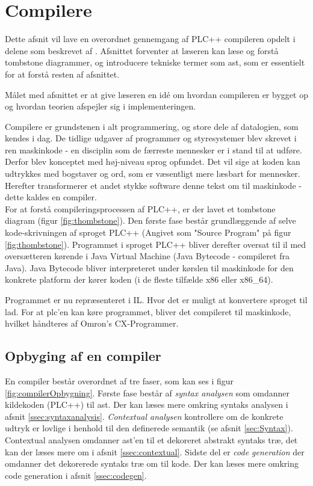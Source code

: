 \section{Compilere}
\noindent Dette afsnit vil lave en overordnet gennemgang af PLC++ compileren opdelt i delene som beskrevet af \textcite{CraftingCompiler_2009}. Afsnittet forventer at læseren kan læse og forstå tombstone diagrammer, og introducere tekniske termer som \acrlong{ast}, som er essentielt for at forstå resten af afsnittet. 

Målet med afsnittet er at give læseren en idé om hvordan compileren er bygget op og hvordan teorien afspejler sig i implementeringen.

\bigskip

\noindent Compilere er grundstenen i alt programmering, og store dele af datalogien, som kendes i dag. De tidlige udgaver af programmer og styresystemer blev skrevet i ren maskinkode - en disciplin som de færreste mennesker er i stand til at udføre. Derfor blev konceptet med høj-niveau sprog opfundet. Det vil sige at koden kan udtrykkes med bogstaver og ord, som er væsentligt mere læsbart for mennesker. Herefter transformerer et andet stykke software denne tekst om til maskinkode - dette kaldes en compiler. \\

\noindent For at forstå compileringsprocessen af PLC++, er der lavet et tombstone diagram (figur \ref{fig:thombstone}). Den første fase består grundlæggende af selve kode-skrivningen af sproget PLC++ (Angivet som "Source Program" på figur \ref{fig:thombstone}). Programmet i sproget PLC++ bliver derefter oversat til \gls{il} med oversætteren kørende i Java Virtual Machine (Java Bytecode - compileret fra Java). Java Bytecode bliver interpreteret under kørslen til maskinkode for den konkrete platform der kører koden (i de fleste tilfælde x86 eller x86\_64).

\noindent Programmet er nu repræsenteret i IL. Hvor det er muligt at konvertere sproget til \gls{lad}. For at \gls{plc}’en kan køre programmet, bliver det compileret til maskinkode, hvilket håndteres af Omron’s CX-Programmer.


\subsection{Opbyging af en compiler}
En compiler består overordnet af tre faser, som kan ses i figur \ref{fig:compilerOpbygning}. Første fase består af \textit{syntax analysen} som omdanner kildekoden (PLC++) til \gls{ast}. Der kan læses mere omkring syntaks analysen i afsnit \ref{ssec:syntaxanalysis}. \textit{Contextual analysen} kontrollere om de konkrete udtryk er lovlige i henhold til den definerede semantik (se afsnit \ref{sec:Syntax}). Contextual analysen omdanner \gls{ast}'en til et dekoreret abstrakt syntaks træ, det kan der læses mere om i afsnit \ref{ssec:contextual}. Sidste del er \textit{code generation} der omdanner det dekorerede syntaks træ om til kode. Der kan læses mere omkring code generation i afsnit \ref{ssec:codegen}.

